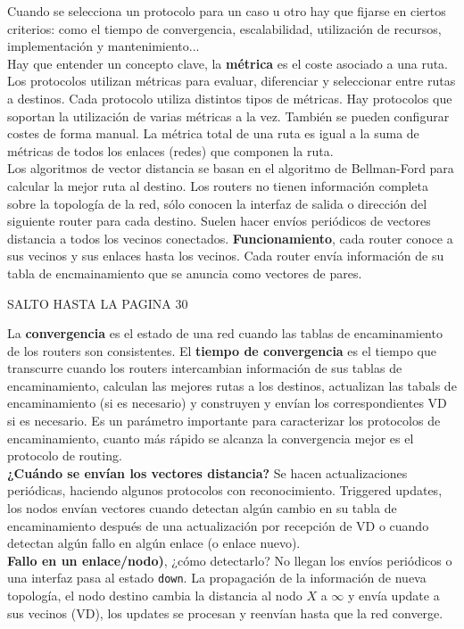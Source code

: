 \documentclass[10pt,portrait, twocolumn]{article}
\begin{document}
Cuando se selecciona un protocolo para un caso u otro  hay que fijarse en ciertos criterios: como el tiempo de convergencia, escalabilidad, utilización de recursos, implementación y mantenimiento...\\

Hay que entender un concepto clave, la \textbf{métrica} es el coste asociado a una ruta. Los protocolos utilizan métricas para evaluar, diferenciar y seleccionar entre rutas a destinos. Cada protocolo utiliza distintos tipos de métricas. Hay protocolos que soportan la utilización de varias métricas a la vez. También se pueden configurar costes de forma manual. La métrica total de una ruta es igual a la suma de métricas de todos los enlaces (redes) que componen la ruta.\\

Los algoritmos de vector distancia se basan en el algoritmo de Bellman-Ford para calcular la mejor ruta al destino. Los routers no tienen información completa sobre la topología de la red, sólo conocen la interfaz de salida o dirección del siguiente router para cada destino. Suelen hacer envíos periódicos de vectores distancia a todos los vecinos conectados. \textbf{Funcionamiento}, cada router conoce a sus vecinos y sus enlaces hasta los vecinos. Cada router envía información de su tabla de encmainamiento que se anuncia como vectores de pares.

SALTO HASTA LA PAGINA 30

La \textbf{convergencia} es el estado de una red cuando las tablas de encaminamiento de los routers son consistentes. El \textbf{tiempo de convergencia} es el tiempo que transcurre cuando los routers intercambian información de sus tablas de encaminamiento, calculan las mejores rutas a los destinos, actualizan las tabals de encaminamiento (si es necesario) y construyen y envían los correspondientes VD si es necesario. Es un parámetro importante para caracterizar los protocolos de encaminamiento, cuanto más rápido se alcanza la convergencia mejor es el protocolo de routing.\\

\textbf{¿Cuándo se envían los vectores distancia?} Se hacen actualizaciones periódicas, haciendo algunos protocolos con reconocimiento. Triggered updates, los nodos envían vectores cuando detectan algún cambio en su tabla de encaminamiento después de una actualización por recepción de VD o cuando detectan algún fallo en algún enlace (o enlace nuevo).\\

\textbf{Fallo en un enlace/nodo)}, ¿cómo detectarlo? No llegan los envíos periódicos o una interfaz pasa al estado \texttt{down}. La propagación de la información de nueva topología, el nodo destino cambia la distancia al nodo $X$ a $\infty$ y envía update a sus vecinos (VD), los updates se procesan y reenvían hasta que la red converge.\\
\end{document}
